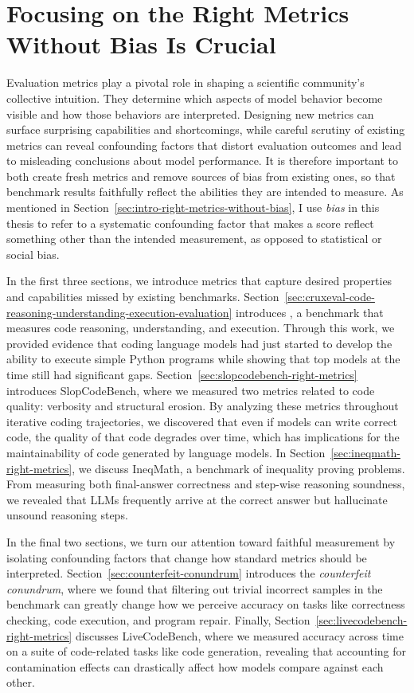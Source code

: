 \chapter{Focusing on the Right Metrics Without Bias Is Crucial}
\label{chap:right-metrics}

Evaluation metrics play a pivotal role in shaping a scientific community's collective intuition.
They determine which aspects of model behavior become visible and how those behaviors are
interpreted. Designing new metrics can surface surprising capabilities and shortcomings, while
careful scrutiny of existing metrics can reveal confounding factors that distort evaluation
outcomes and lead to misleading conclusions about model performance. It is therefore important to
both create fresh metrics and remove sources of bias from existing ones, so that benchmark
results faithfully reflect the abilities they are intended to measure.
As mentioned in Section~\ref{sec:intro-right-metrics-without-bias}, I use \textit{bias}
in this thesis to refer to a systematic confounding factor that makes a score reflect
something other than the intended measurement, as opposed to statistical or social bias.

In the first three sections, we introduce metrics that capture desired
properties and capabilities missed by existing benchmarks. Section~\ref{sec:cruxeval-code-reasoning-understanding-execution-evaluation}
introduces \benchmark, a benchmark that measures code reasoning, understanding, and execution.
Through this work, we provided evidence that coding language models had just started to develop
the ability to execute simple Python programs while showing that top models at the time still
had significant gaps. Section~\ref{sec:slopcodebench-right-metrics} introduces SlopCodeBench,
where we measured two metrics related to code quality: verbosity and structural erosion. By analyzing
these metrics throughout iterative coding trajectories, we discovered that even if models can write correct code,
the quality of that code degrades over time, which has implications for the maintainability of code generated by language models.
In Section~\ref{sec:ineqmath-right-metrics}, we discuss IneqMath, a benchmark of inequality proving problems.
From measuring both final-answer correctness and step-wise reasoning soundness, we revealed that LLMs frequently
arrive at the correct answer but hallucinate unsound reasoning steps.

In the final two sections, we turn our attention toward faithful measurement by isolating
confounding factors that change how standard metrics should be interpreted. Section~\ref{sec:counterfeit-conundrum} introduces the
\textit{counterfeit conundrum}, where we found that filtering out trivial incorrect samples in the
benchmark can greatly change how we perceive accuracy on tasks like correctness checking, code execution,
and program repair. Finally, Section~\ref{sec:livecodebench-right-metrics} discusses LiveCodeBench, where we
measured accuracy across time on a suite of code-related tasks like code generation, revealing that accounting for
contamination effects can drastically affect how models compare against each other.

